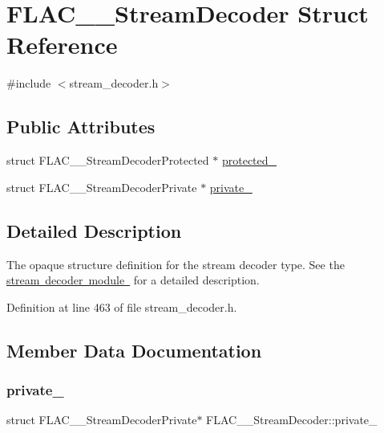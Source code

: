 \hypertarget{struct_f_l_a_c_____stream_decoder}{}\section{F\+L\+A\+C\+\_\+\+\_\+\+Stream\+Decoder Struct Reference}
\label{struct_f_l_a_c_____stream_decoder}


{\ttfamily \#include $<$stream\+\_\+decoder.\+h$>$}

\subsection*{Public Attributes}
\begin{DoxyCompactItemize}
\item 
struct F\+L\+A\+C\+\_\+\+\_\+\+Stream\+Decoder\+Protected $\ast$ \mbox{\hyperlink{struct_f_l_a_c_____stream_decoder_a17beb7a75f968592700bddec512f204d}{protected\+\_\+}}
\item 
struct F\+L\+A\+C\+\_\+\+\_\+\+Stream\+Decoder\+Private $\ast$ \mbox{\hyperlink{struct_f_l_a_c_____stream_decoder_a3a894a4d1204155c5a4e4add9d8f75f9}{private\+\_\+}}
\end{DoxyCompactItemize}


\subsection{Detailed Description}
The opaque structure definition for the stream decoder type. See the \mbox{\hyperlink{group__flac__stream__decoder}{stream decoder module }} for a detailed description. 

Definition at line 463 of file stream\+\_\+decoder.\+h.



\subsection{Member Data Documentation}
\mbox{\label{struct_f_l_a_c_____stream_decoder_a3a894a4d1204155c5a4e4add9d8f75f9}} 
\subsubsection{\texorpdfstring{private\_}{private\_}}
{\footnotesize\ttfamily struct F\+L\+A\+C\+\_\+\+\_\+\+Stream\+Decoder\+Private$\ast$ F\+L\+A\+C\+\_\+\+\_\+\+Stream\+Decoder\+::private\+\_\+}



